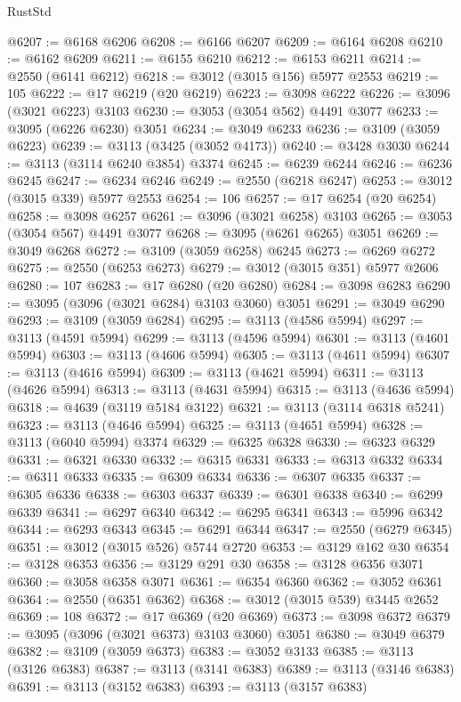 \begin{lexlean}{RustStd}
\begin{coremodule}
{\begin{coremodule}
{{{{{{{{{{{{{{{{{{{{{{{{{{{{{{{{@6207 := @6168 @6206
@6208 := @6166 @6207
@6209 := @6164 @6208
@6210 := @6162 @6209
@6211 := @6155 @6210
@6212 := @6153 @6211
@6214 := @2550 (@6141 @6212)
@6218 := @3012 (@3015 @156) @5977 @2553
@6219 := 105
@6222 := @17 @6219 (@20 @6219)
@6223 := @3098 @6222
@6226 := @3096 (@3021 @6223) @3103
@6230 := @3053 (@3054 @562) @4491 @3077
@6233 := @3095 (@6226 @6230) @3051
@6234 := @3049 @6233
@6236 := @3109 (@3059 @6223)
@6239 := @3113 (@3425 (@3052 @4173))
@6240 := @3428 @3030
@6244 := @3113 (@3114 @6240 @3854) @3374
@6245 := @6239 @6244
@6246 := @6236 @6245
@6247 := @6234 @6246
@6249 := @2550 (@6218 @6247)
@6253 := @3012 (@3015 @339) @5977 @2553
@6254 := 106
@6257 := @17 @6254 (@20 @6254)
@6258 := @3098 @6257
@6261 := @3096 (@3021 @6258) @3103
@6265 := @3053 (@3054 @567) @4491 @3077
@6268 := @3095 (@6261 @6265) @3051
@6269 := @3049 @6268
@6272 := @3109 (@3059 @6258) @6245
@6273 := @6269 @6272
@6275 := @2550 (@6253 @6273)
@6279 := @3012 (@3015 @351) @5977 @2606
@6280 := 107
@6283 := @17 @6280 (@20 @6280)
@6284 := @3098 @6283
@6290 := @3095 (@3096 (@3021 @6284) @3103 @3060) @3051
@6291 := @3049 @6290
@6293 := @3109 (@3059 @6284)
@6295 := @3113 (@4586 @5994)
@6297 := @3113 (@4591 @5994)
@6299 := @3113 (@4596 @5994)
@6301 := @3113 (@4601 @5994)
@6303 := @3113 (@4606 @5994)
@6305 := @3113 (@4611 @5994)
@6307 := @3113 (@4616 @5994)
@6309 := @3113 (@4621 @5994)
@6311 := @3113 (@4626 @5994)
@6313 := @3113 (@4631 @5994)
@6315 := @3113 (@4636 @5994)
@6318 := @4639 (@3119 @5184 @3122)
@6321 := @3113 (@3114 @6318 @5241)
@6323 := @3113 (@4646 @5994)
@6325 := @3113 (@4651 @5994)
@6328 := @3113 (@6040 @5994) @3374
@6329 := @6325 @6328
@6330 := @6323 @6329
@6331 := @6321 @6330
@6332 := @6315 @6331
@6333 := @6313 @6332
@6334 := @6311 @6333
@6335 := @6309 @6334
@6336 := @6307 @6335
@6337 := @6305 @6336
@6338 := @6303 @6337
@6339 := @6301 @6338
@6340 := @6299 @6339
@6341 := @6297 @6340
@6342 := @6295 @6341
@6343 := @5996 @6342
@6344 := @6293 @6343
@6345 := @6291 @6344
@6347 := @2550 (@6279 @6345)
@6351 := @3012 (@3015 @526) @5744 @2720
@6353 := @3129 @162 @30
@6354 := @3128 @6353
@6356 := @3129 @291 @30
@6358 := @3128 @6356 @3071
@6360 := @3058 @6358 @3071
@6361 := @6354 @6360
@6362 := @3052 @6361
@6364 := @2550 (@6351 @6362)
@6368 := @3012 (@3015 @539) @3445 @2652
@6369 := 108
@6372 := @17 @6369 (@20 @6369)
@6373 := @3098 @6372
@6379 := @3095 (@3096 (@3021 @6373) @3103 @3060) @3051
@6380 := @3049 @6379
@6382 := @3109 (@3059 @6373)
@6383 := @3052 @3133
@6385 := @3113 (@3126 @6383)
@6387 := @3113 (@3141 @6383)
@6389 := @3113 (@3146 @6383)
@6391 := @3113 (@3152 @6383)
@6393 := @3113 (@3157 @6383)
}}}}}}}}}}}}}}}}}}}}}}}}}}}}}}}}
\end{coremodule}}
\end{coremodule}
\end{lexlean}
